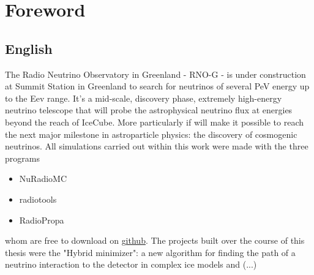 \documentclass[11pt,a4paper,faculty=we,language=en,doctype=report]{cls/ugent-doc}
\renewcommand{\ULthickness}{2pt} %
\begin{document}

\maketitle
\renewcommand{\ULthickness}{1pt}


{\hypersetup{hidelinks}\tableofcontents} %
\newpage


\chapter{Foreword}
\section*{English}
The Radio Neutrino Observatory in Greenland - RNO-G - is under construction at Summit Station in Greenland to search for neutrinos of several PeV energy up to the Eev range. It's a mid-scale, discovery phase, extremely high-energy neutrino telescope that will probe the astrophysical neutrino flux at energies beyond the reach of IceCube.
More particularly if will make it possible to reach the next major milestone in astroparticle physics: the discovery of cosmogenic neutrinos.
\vspace{0.5cm}
All simulations carried out within this work were made with the three programs 
\begin{itemize}
	\item NuRadioMC
	\item radiotools
	\item RadioPropa
\end{itemize}
whom are free to download on \href{https://github.com/nu-radio}{github}.
The projects built over the course of this thesis were the "Hybrid minimizer": a new
algorithm for finding the path of a neutrino interaction to the detector in complex ice models
and (...)
\end{document}
